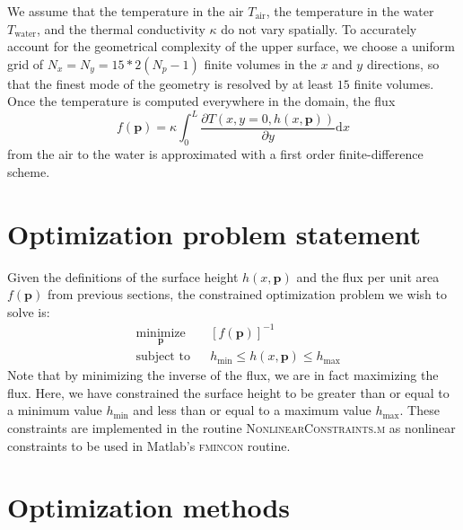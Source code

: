 \documentclass[11pt]{article}
\begin{document}
We assume that the temperature in the air $T_{\text{air}}$,
the temperature in the water $T_{\text{water}}$,
and the thermal conductivity $\kappa$ do not vary spatially.
To accurately account for the geometrical complexity of the upper
surface,
we choose a uniform grid of $N_x = N_y = 15*2(N_p-1)$
finite volumes in the $x$ and $y$ directions, so that the finest mode
of the geometry is resolved by at least $15$ finite volumes.
Once the temperature is computed everywhere in the domain,
the flux
\begin{equation}
f(\boldsymbol{p}) = \kappa \int_0^L
\frac{\partial T(x,y=0,h(x,\boldsymbol{p}))}{\partial y} \text{d} x
\end{equation}
from the air to the water is approximated with a first order
finite-difference scheme.

\section{Optimization problem statement}

Given the definitions of the surface height
$h(x, \boldsymbol{p})$ and the flux per unit area $f(\boldsymbol{p})$
from previous sections, the constrained optimization problem we wish
to solve is: 
\begin{equation}
\begin{aligned}
& \underset{\boldsymbol{p}}{\text{minimize}}
& & \left[ f(\boldsymbol{p}) \right]^{-1} \\
& \text{subject to}
& & h_{\text{min}} \leq h(x, \boldsymbol{p}) \leq h_{\text{max}}
\end{aligned}
\label{eq:optimize}
\end{equation}
Note that by minimizing the inverse of the flux, we are in fact maximizing
the flux. Here, we have constrained the surface height to be greater than
or equal to a minimum value $h_{\text{min}}$ and less than or equal
to a maximum value $h_{\text{max}}$. These constraints are
implemented in the routine \textsc{NonlinearConstraints.m} as
nonlinear constraints to be used in Matlab's  \textsc{fmincon} routine.

\section{Optimization methods}
\end{document}
